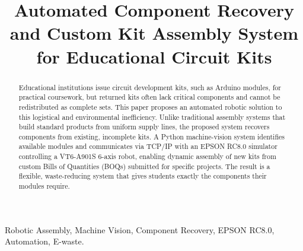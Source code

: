 \documentclass[11pt,conference]{IEEEtran}
\begin{document}
\title{Automated Component Recovery and Custom Kit Assembly System for Educational Circuit Kits\\}

\author{
\and
{}
\and
{}
}

\maketitle

\begin{abstract}
Educational institutions issue circuit development kits, such as Arduino modules, for practical coursework, but returned kits often lack critical components and cannot be redistributed as complete sets. This paper proposes an automated robotic solution to this logistical and environmental inefficiency. Unlike traditional assembly systems that build standard products from uniform supply lines, the proposed system recovers components from existing, incomplete kits. A Python machine-vision system identifies available modules and communicates via TCP/IP with an EPSON RC8.0 simulator controlling a VT6-A901S 6-axis robot, enabling dynamic assembly of new kits from custom Bills of Quantities (BOQs) submitted for specific projects. The result is a flexible, waste-reducing system that gives students exactly the components their modules require.
\end{abstract}

\begin{IEEEkeywords}
Robotic Assembly, Machine Vision, Component Recovery, EPSON RC8.0, Automation, E-waste.
\end{IEEEkeywords}
\end{document}
